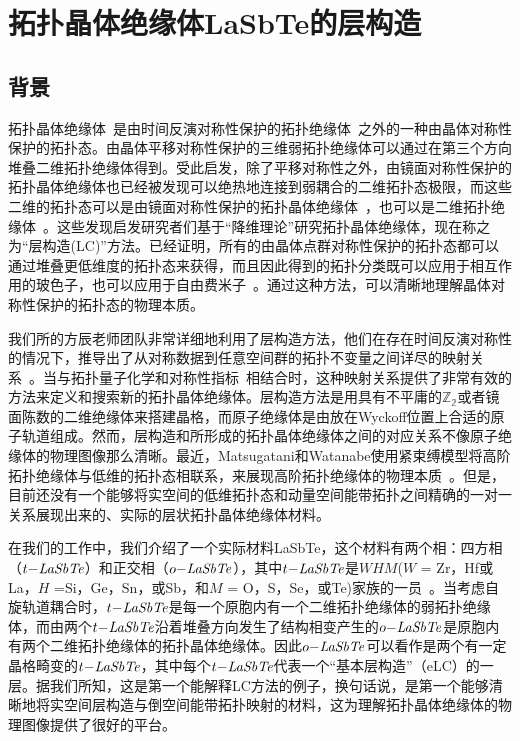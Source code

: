 \chapter{拓扑晶体绝缘体LaSbTe的层构造}\label{chap:lasbte}



\section{背景}
拓扑晶体绝缘体~\citep{fu2011topological}是由时间反演对称性保护的拓扑绝缘体~\citep{TIreview,qi2011,weng2015quantum}之外的一种由晶体对称性保护的拓扑态。由晶体平移对称性保护的三维弱拓扑绝缘体可以通过在第三个方向堆叠二维拓扑绝缘体得到。受此启发，除了平移对称性之外，由镜面对称性保护的拓扑晶体绝缘体也已经被发现可以绝热地连接到弱耦合的二维拓扑态极限，而这些二维的拓扑态可以是由镜面对称性保护的拓扑晶体绝缘体~\citep{kim2015}，也可以是二维拓扑绝缘体~\citep{Fulga2016}。这些发现启发研究者们基于“降维理论”研究拓扑晶体绝缘体，现在称之为“层构造(LC)”方法。已经证明，所有的由晶体点群对称性保护的拓扑态都可以通过堆叠更低维度的拓扑态来获得，而且因此得到的拓扑分类既可以应用于相互作用的玻色子，也可以应用于自由费米子~\citep{huang2017,hsong2017,Songreal,Song2019}。通过这种方法，可以清晰地理解晶体对称性保护的拓扑态的物理本质。

我们所的方辰老师团队非常详细地利用了层构造方法，他们在存在时间反演对称性的情况下，推导出了从对称数据到任意空间群的拓扑不变量之间详尽的映射关系~\citep{song2017}。当与拓扑量子化学和对称性指标~\citep{tqc2017,nc_ashvin,Kruthoff2017}相结合时，这种映射关系提供了非常有效的方法来定义和搜索新的拓扑晶体绝缘体。层构造方法是用具有不平庸的$\mathbb{Z_2}$或者镜面陈数的二维绝缘体来搭建晶格，而原子绝缘体是由放在Wyckoff位置上合适的原子轨道组成。然而，层构造和所形成的拓扑晶体绝缘体之间的对应关系不像原子绝缘体的物理图像那么清晰。最近，Matsugatani和Watanabe使用紧束缚模型将高阶拓扑绝缘体与低维的拓扑态相联系，来展现高阶拓扑绝缘体的物理本质~\citep{haruki2018}。但是，目前还没有一个能够将实空间的低维拓扑态和动量空间能带拓扑之间精确的一对一关系展现出来的、实际的层状拓扑晶体绝缘体材料。

在我们的工作中，我们介绍了一个实际材料LaSbTe，这个材料有两个相：四方相（$t\it{-LaSbTe}$）和正交相（$o\it{-LaSbTe}$），其中$t\it{-LaSbTe}$是$WHM$($W$ = Zr，Hf或La，$H$ =Si，Ge，Sn，或Sb，和$M$ = O，S，Se，或Te)家族的一员~\citep{xu2015two}。当考虑自旋轨道耦合时，$t\it{-LaSbTe}$是每一个原胞内有一个二维拓扑绝缘体的弱拓扑绝缘体，而由两个$t\it{-LaSbTe}$沿着堆叠方向发生了结构相变产生的$o\it{-LaSbTe}$是原胞内有两个二维拓扑绝缘体的拓扑晶体绝缘体。因此$o\it{-LaSbTe}$可以看作是两个有一定晶格畸变的$t\it{-LaSbTe}$，其中每个$t\it{-LaSbTe}$代表一个“基本层构造”（eLC）的一层。据我们所知，这是第一个能解释LC方法的例子，换句话说，是第一个能够清晰地将实空间层构造与倒空间能带拓扑映射的材料，这为理解拓扑晶体绝缘体的物理图像提供了很好的平台。


